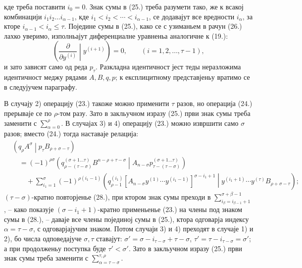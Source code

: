 \documentclass[11pt]{article}
\newcommand{\pair}[2]{\left(#1\middle|#2\right)}
\begin{document}
кде треба поставити $i_0=0$. Знак сумы в (25.) треба разумети тако, же к всакој комбинацији $i_1i_2\ldots i_{\alpha-1}$, кде $i_1<i_2<\cdots<i_{\alpha-1}$, се додавајут все вредности $i_\alpha$, за кторе $i_{\alpha-1}<i_\alpha\le\tau$. Поједине сумы в (25.), како се с узиманьем в рачун (26.) лахко уверимо, изполньајут диференциалне уравненьа аналогичне к (19.):
\begin{equation}
 \left(\frac{\partial}{\partial y^{(i)}}\middle|y^{(i+1)}\right)=0,
 \qquad (i=1,2,\ldots,\tau-1),
\tag{27}
\end{equation}
и зато зависят само од реда $p_\tau$. Разкладна идентичност јест теды неразложима идентичност меджу рядами $A,B,q,p$; к експлицитному представјеньу вратимо се в следујучем параграфу.

В случају 2) операцију (23.) такоже можно применити $\tau$ разов, но операција (24.) прерываје се по $\rho$-том разу. Зато в закльучном изразу (25.) први знак сумы треба заменити с $\sum_{\alpha=0}^{\rho}$. В случајах 3) и 4) операцију (23.) можно извршити само $\sigma$ разов; вместо (24.) тогда наставаје релација:
\begin{equation}
\begin{aligned}
&\pair{q_\rho A^\sigma}{p_\tau B_{\rho+\sigma-\tau}}\\
&\quad=(-1)^{\rho\sigma}
\pair{q_{\rho-(\tau-\sigma)}^{(\sigma+1\ldots\tau)}B^{n-\rho+\tau-\sigma}}
{A_{n-\sigma}p_{\tau-(\tau-\sigma)}^{(\sigma+1\ldots\tau)}}\\
&\qquad+\sum_{i_1=1}^{\sigma}(-1)^{\rho(i_1-1)}
\pair{q_{\rho-1}^{(i_1)}
[A_{n-\sigma}y^{(1)}\cdots y^{(i_1-1)}]^{\sigma-i_1+1}}
{y^{(i_1+1)}\cdots y^{(\tau)}B_{\rho+\sigma-\tau}};
\end{aligned}
\tag{28}
\end{equation}
$(\tau-\sigma)$-кратно повторјенье (28.), при ктором знак сумы преходи в $\sum_{i_\beta=i_{\beta-1}+1}^{\sigma+\beta-1}$, -- како показује $(\sigma-i_1+1)$-кратно применьенье (23.) на члены под знаком сумы в (28.), -- даваје все члены појединој сумы в (25.), ктора одговарја индексу $\alpha=\tau-\sigma$, с одговарјајучим знаком. Потом случаји 3) и 4) преходят в случаје 1) и 2), бо числа одповедајуче $\sigma,\tau$ ставајут: $\sigma'=\sigma-i_{\tau-\sigma}+\tau-\sigma$, $\tau'=\tau-i_{\tau-\sigma}=\sigma'$; а при продолженьу поступка буде $\tau'<\sigma'$. Зато в закльучном изразу (25.) први знак сумы треба заменити с $\sum_{\alpha=\tau-\sigma}^{\tau,\rho}$.
\end{document}
